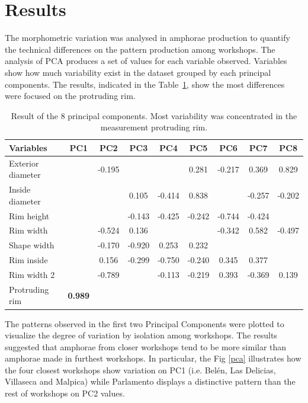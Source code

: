 \documentclass[review]{elsarticle}
\begin{document}


\section{Results}

The morphometric variation was analysed in amphorae production to quantify the technical differences on the pattern production among workshops. 
The analysis of PCA produces a set of values for each variable observed. Variables show how much variability exist in the dataset grouped by each principal components. The results, indicated in the Table~\ref{table:variable}, show the most differences were focused on the protruding rim. 

\begin{table}[htp]
\begin{tabular}{lcccccccc}
\hline
 Variables		&    PC1 & PC2	& PC3 & PC4 & PC5 & PC6 & PC7 & PC8     \\ \hline
 Exterior diameter& 		 &-0.195	&	  &  	&0.281&-0.217&0.369&0.829           \\
 Inside diameter& 		 &		&0.105&-0.414&0.838&	    &-0.257&-0.202           \\
 Rim height&              &      &-0.143&-0.425&-0.242&-0.744&-0.424&           \\
 Rim width&       		 &-0.524	&0.136&  	&	  &-0.342&0.582&-0.497        \\
 Shape width&     		 &-0.170	&-0.920&0.253&0.232&		&     &          \\
 Rim inside&     		 &0.156 &-0.299&-0.750&-0.240&0.345&0.377&          \\                                    
 Rim width 2& 	         &-0.789	&	  &-0.113&-0.219	&0.393&-0.369&0.139          \\	
Protruding rim& \textbf{0.989} &      &      &     &     &     &     &          \\
\hline
\end{tabular}
\caption{Result of the 8 principal components. Most variability was concentrated in the measurement protruding rim.}
\label{table:variable}
\end{table}

The patterns observed in the first two Principal Components were plotted to visualize the degree of variation by isolation among workshops. The results suggested that amphorae from closer workshops tend to be more similar than amphorae made in furthest workshops. In particular, the Fig \ref{pca} illustrates how the four closest workshops show variation on PC1 (i.e. Bel\'en, Las Delicias, Villaseca and Malpica) while Parlamento displays a distinctive pattern than the rest of workshops on PC2 values. 
\end{document}
